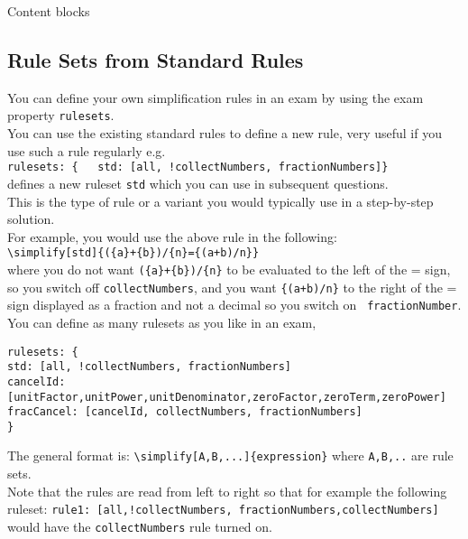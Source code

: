 \begin{chapter}{\label{cha:content_blocks}Content blocks}
 \subsection{\label{sec:Rule Sets Standard} Rule Sets from Standard Rules}
 You can define your own simplification rules in an exam by using the exam property \verb"rulesets".\\
 You can use the existing standard rules to define a new rule, very useful if you use such a rule regularly e.g.\\
	\verb"rulesets: {	std: [all, !collectNumbers, fractionNumbers]} "\\
	defines a new ruleset \verb"std" which you can use in subsequent questions.\\
	This is the type of rule or a variant you would typically use in a step-by-step solution.\\
	For example, you would use the above rule in the following:\\
	\verb"\simplify[std]{({a}+{b})/{n}={(a+b)/n}}"\\
	where you do not want \verb"({a}+{b})/{n}" to be evaluated to the left of the = sign, so you switch off \verb"collectNumbers", and you want \verb"{(a+b)/n}" to the right of the = sign displayed as a fraction and not a decimal so you switch on \verb" fractionNumber".\\
	You can define as many rulesets as you like in an exam, \eg
		\begin{Verbatim}
rulesets: {
std: [all, !collectNumbers, fractionNumbers]
cancelId: [unitFactor,unitPower,unitDenominator,zeroFactor,zeroTerm,zeroPower]
fracCancel: [cancelId, collectNumbers, fractionNumbers]
}
	\end{Verbatim}
	The general format is:
	 \verb"\simplify[A,B,...]{expression}" where \verb"A,B,.." are rule sets.\\
  Note that the rules are read from left to right so that for example the following ruleset:
  \verb"rule1: [all,!collectNumbers, fractionNumbers,collectNumbers]"\\
  would have the \verb"collectNumbers" rule turned on.\\

\end{chapter}
